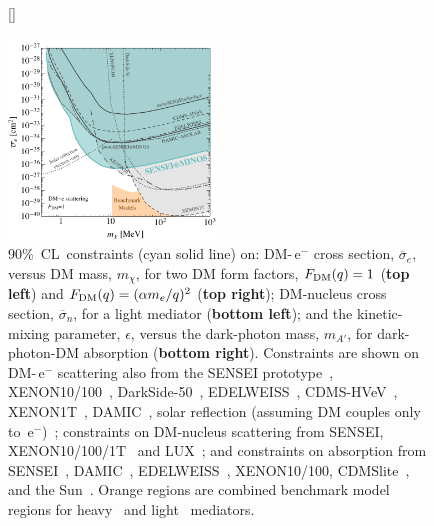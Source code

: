 \documentclass[aps,prl,twocolumn,showpacs,superscriptaddress,preprintnumbers]{revtex4-1}
\newcommand{\unit}[1]{\ensuremath{\mathrm{\,#1}}\xspace}
\newcommand{\e}{\unit{e^{-}}}
\begin{document}
\begin{nolinenumbers}
\begin{figure}
\hskip -1cm 
[\FBwidth]
{\caption{
90\%~CL~constraints (cyan solid line) on: DM-\e cross section, $\overline{\sigma}_e$, 
versus DM mass, $m_\chi$, for two DM form factors, $F_{\rm DM}(q)=1$ (\textbf{top left}) and $F_{\rm DM}(q)=(\alpha m_e/q)^2$ (\textbf{top right});  DM-nucleus cross section, $\overline{\sigma}_n$, for a light mediator (\textbf{bottom left}); and the kinetic-mixing parameter, $\epsilon$, versus the dark-photon mass, $m_{A'}$, for dark-photon-DM absorption (\textbf{bottom right}). 
Constraints are shown on DM-\e scattering also from the SENSEI prototype~\cite{Crisler:2018gci,Abramoff:2019dfb}, XENON10/100~\cite{Essig:2017kqs}, DarkSide-50~\cite{Agnes:2018oej}, EDELWEISS~\cite{Arnaud:2020svb}, CDMS-HVeV~\cite{Agnese:2018col},
XENON1T~\cite{Aprile:2019xxb},
DAMIC~\cite{Aguilar-Arevalo:2019wdi}, solar reflection (assuming DM couples only to \e)~\cite{An:2017ojc}; constraints on DM-nucleus scattering from SENSEI, XENON10/100/1T~\cite{Essig:2019xkx} and LUX~\cite{Akerib:2018hck}; and constraints on absorption from SENSEI~\cite{Crisler:2018gci,Abramoff:2019dfb}, DAMIC~\cite{Aguilar-Arevalo:2016zop,Aguilar-Arevalo:2019wdi}, EDELWEISS~\cite{Arnaud:2020svb}, XENON10/100, CDMSlite~\cite{Bloch:2016sjj}, and the Sun~\cite{An:2013yfc,Redondo:2013lna,Bloch:2016sjj}. Orange regions are combined benchmark model regions for heavy~\cite{Boehm:2003hm, Essig:2011nj,Lin:2011gj,Essig:2015cda,Hochberg:2014dra,Kuflik:2017iqs,DAgnolo:2019zkf} and light~\cite{Essig:2011nj,Essig:2015cda,Chu:2011be,Dvorkin:2019zdi} mediators.
 \label{fig:DMresults}}}
{%
\begin{minipage}{0.67\textwidth}
\begin{center}
\includegraphics[width=0.49\textwidth]{SENSEI_MINOS2020_FDM1-Paper.pdf}

\end{center}
\end{minipage}}
\end{figure}
\end{nolinenumbers}
\end{document}
